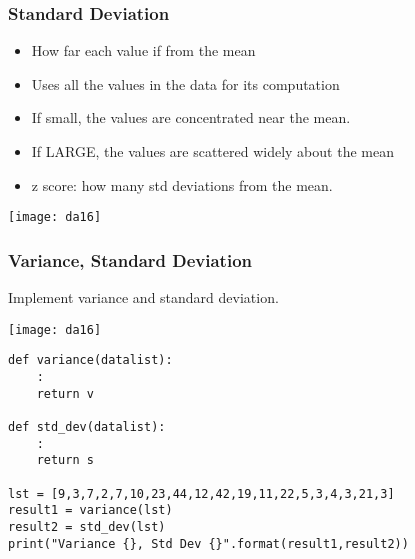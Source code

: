 \begin{frame}[fragile]\frametitle{Standard Deviation}	
\begin{itemize}
\item How far each value if from the mean
\item Uses all the values in the data for its computation
\item If small, the values are concentrated near the mean.
\item If LARGE, the values are scattered widely about the mean
\item z score: how many std deviations from the mean.
\end{itemize}
\begin{center}
\texttt{[image: da16]}
\end{center}
\end{frame}


\begin{frame}[fragile]\frametitle{Variance, Standard Deviation}
Implement variance and standard deviation.
\begin{center}
\texttt{[image: da16]}
\end{center}

\begin{lstlisting}
def variance(datalist):
	:
	return v

def std_dev(datalist):
	:
	return s

lst = [9,3,7,2,7,10,23,44,12,42,19,11,22,5,3,4,3,21,3]
result1 = variance(lst)
result2 = std_dev(lst)
print("Variance {}, Std Dev {}".format(result1,result2))
\end{lstlisting}
\end{frame}


 


